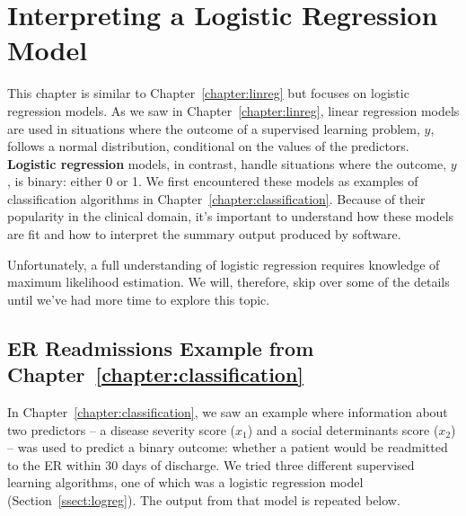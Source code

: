 \chapter{Interpreting a Logistic Regression Model \label{chapter:logreg}}

This chapter is similar to Chapter~\ref{chapter:linreg} but focuses on logistic regression models. As we saw in Chapter~\ref{chapter:linreg}, linear regression models are used in situations where the outcome of a supervised learning problem, $y$, follows a normal distribution, conditional on the values of the predictors. \textbf{Logistic regression} models, in contrast, handle situations where the outcome, $y$, is binary: either 0 or 1. We first encountered these models as examples of classification algorithms in Chapter~\ref{chapter:classification}. Because of their popularity in the clinical domain, it's important to understand how these models are fit and how to interpret the summary output produced by software. 

Unfortunately, a full understanding of logistic regression requires knowledge of maximum likelihood estimation. We will, therefore, skip over some of the details until we've had more time to explore this topic. 


\section{ER Readmissions Example from Chapter~\ref{chapter:classification} \label{sect:eragain}}

In Chapter~\ref{chapter:classification}, we saw an example where information about two predictors -- a disease severity score ($x_1$) and a social determinants score ($x_2$) -- was used to predict a binary outcome: whether a patient would be readmitted to the ER within 30 days of discharge. We tried three different supervised learning algorithms, one of which was a logistic regression model (Section~\ref{ssect:logreg}). The output from that model is repeated below.


